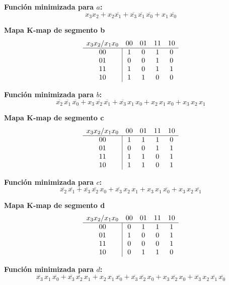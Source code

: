 \documentclass[12pt]{article}
\begin{document}
\noindent
\textbf{Función minimizada para \(a\):}
\[
x_3x_2 + x_2\overline{x_1} + \overline{x_3}\,\overline{x_1}\,\overline{x_0} + x_1\,\overline{x_0}
\]

\noindent
\textbf{Mapa K‐map de segmento \textsf{b}}  
\[
\begin{array}{c|cccc}
\multicolumn{1}{c}{x_3x_2 / x_1x_0} & 00 & 01 & 11 & 10 \\
\hline
00 & 1 & 0 & 1 & 0 \\
01 & 0 & 0 & 1 & 0 \\
11 & 1 & 0 & 1 & 1 \\
10 & 1 & 1 & 0 & 0 \\
\end{array}
\]
\vspace{1em}

\noindent
\textbf{Función minimizada para \(b\):}
\[
\overline{x_2}\,\overline{x_1}\,\overline{x_0} + x_3\,\overline{x_2}\,\overline{x_1} + \overline{x_3}\,x_1\,x_0 + x_2\,x_1\,x_0 + x_3\,x_2\,x_1
\]

\noindent
\textbf{Mapa K‐map de segmento \textsf{c}}  
\[
\begin{array}{c|cccc}
\multicolumn{1}{c}{x_3x_2 / x_1x_0} & 00 & 01 & 11 & 10 \\
\hline
00 & 1 & 1 & 1 & 0 \\
01 & 0 & 0 & 1 & 1 \\
11 & 1 & 1 & 0 & 1 \\
10 & 1 & 1 & 0 & 1 \\
\end{array}
\]
\vspace{1em}

\noindent
\textbf{Función minimizada para \(c\):}
\[
\overline{x_2}\,\overline{x_1} + \overline{x_3}\,\overline{x_2}\,x_0 + \overline{x_3}\,x_2\,x_1 + x_3\,x_1\,\overline{x_0} + x_3\,x_2\,\overline{x_1}
\]

\noindent
\textbf{Mapa K‐map de segmento \textsf{d}}  
\[
\begin{array}{c|cccc}
\multicolumn{1}{c}{x_3x_2 / x_1x_0} & 00 & 01 & 11 & 10 \\
\hline
00 & 0 & 1 & 1 & 1 \\
01 & 1 & 0 & 0 & 1 \\
11 & 0 & 0 & 0 & 1 \\
10 & 0 & 1 & 1 & 0 \\
\end{array}
\]
\vspace{1em}

\noindent
\textbf{Función minimizada para \(d\):}
\[
\overline{x_3}\,x_1\,\overline{x_0} + \overline{x_3}\,\overline{x_2}\,x_1 + x_2\,x_1\,\overline{x_0} + \overline{x_3}\,\overline{x_2}\,x_0 + x_3\,\overline{x_2}\,x_0 + \overline{x_3}\,x_2\,\overline{x_1}\,\overline{x_0}
\]
\end{document}

